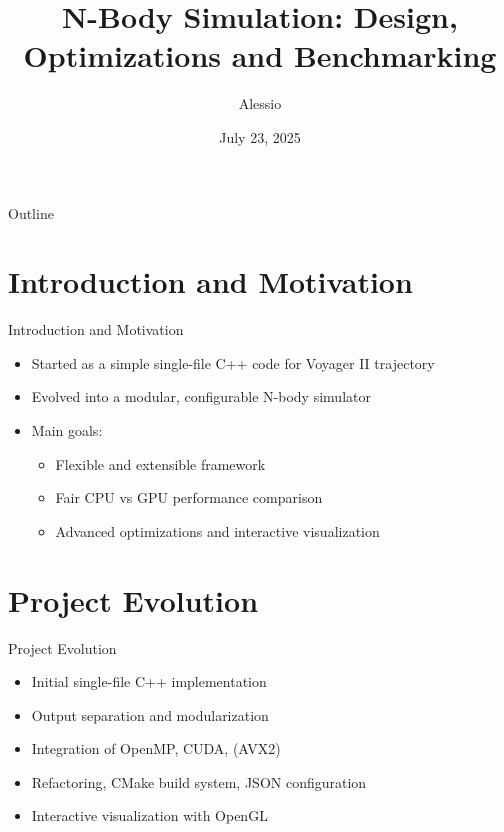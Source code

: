 \documentclass{beamer}
\title{N-Body Simulation: Design, Optimizations and Benchmarking}
\author[Alessio]{Alessio}
\institute{M. Sc. Physics of Data, University of Padova}
\date{July 23, 2025}
\begin{document}
\frame{\titlepage}

\begin{frame}{Outline}
    \tableofcontents
\end{frame}



\section{Introduction and Motivation}
\begin{frame}{Introduction and Motivation}
    \begin{itemize}
        \item Started as a simple single-file C++ code for Voyager II trajectory
        \item Evolved into a modular, configurable N-body simulator
        \item Main goals:
        \begin{itemize}
            \item Flexible and extensible framework
            \item Fair CPU vs GPU performance comparison
            \item Advanced optimizations and interactive visualization
        \end{itemize}
    \end{itemize}
\end{frame}

\section{Project Evolution}
\begin{frame}{Project Evolution}
    \begin{itemize}
        \item Initial single-file C++ implementation
        \item Output separation and modularization
        \item Integration of OpenMP, CUDA, (AVX2)
        \item Refactoring, CMake build system, JSON configuration
        \item Interactive visualization with OpenGL
    \end{itemize}
\end{frame}
\end{document}
